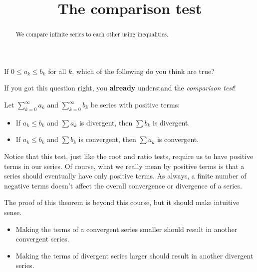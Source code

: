 \documentclass{ximera}
\title[Dig-In:]{The comparison test}
\begin{document}
\begin{abstract}
We compare infinite series to each other using inequalities.
\end{abstract}
\maketitle

\begin{question}
  If $0 \leq a_k \leq b_k$ for all $k$, which of the following do you
  think are true?
  \begin{selectAll}
  \end{selectAll}
\end{question}

If you got this question right, you \textbf{already} understand the
\textit{comparison test}!

\begin{theorem}
  Let $\sum_{k=0}^\infty a_k$ and $\sum_{k=0}^\infty b_k$ be series with positive
  terms:
  \begin{itemize}
  \item If $a_k \leq b_k$ and $\sum a_k$ is divergent, then
    $\sum b_k$ is divergent.
  \item If $a_k \leq b_k$ and $\sum b_k$ is convergent, then
    $\sum a_k$ is convergent.
  \end{itemize}
\end{theorem}

Notice that this test, just like the root and ratio tests, require us to have 
positive terms in our series.  Of course, what we really mean by 
positive terms is that a series should eventually have only positive terms. 
As always, a finite number of negative terms doesn't affect the overall 
convergence or divergence of a series.

The proof of this theorem is beyond this course, but it should make
intuitive sense.
\begin{itemize}
  \item Making the terms of a convergent series smaller should result
    in another convergent series.
  \item Making the terms of divergent series larger should result in
      another divergent series.
\end{itemize}
\end{document}
